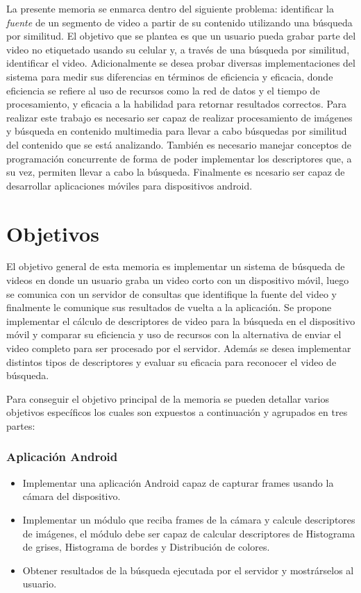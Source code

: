 La presente memoria se enmarca dentro del siguiente problema: identificar la \emph{fuente} de un segmento de video a partir de su contenido utilizando una búsqueda por similitud. El objetivo que se plantea es que un usuario pueda grabar parte del video no etiquetado usando su celular y, a través de una búsqueda por similitud, identificar el video. 
Adicionalmente se desea probar diversas implementaciones del sistema para medir sus diferencias en términos de eficiencia y eficacia, donde eficiencia se refiere al uso de recursos como la red de datos y el tiempo de procesamiento, y eficacia a la habilidad para retornar resultados correctos. Para realizar este trabajo es necesario ser capaz de realizar procesamiento de imágenes y búsqueda en contenido multimedia para llevar a cabo búsquedas por similitud del contenido que se está analizando. También es necesario manejar conceptos de programación concurrente de forma de poder implementar los descriptores que, a su vez, permiten llevar a cabo la búsqueda. Finalmente es ncesario ser capaz de desarrollar aplicaciones móviles para dispositivos android.

\section{Objetivos} \label{objetivos}

El objetivo general de esta memoria es implementar un sistema de búsqueda de videos en donde un usuario graba un video corto con un dispositivo móvil, luego se comunica con un servidor de consultas que identifique la fuente del video y finalmente le comunique sus resultados de vuelta a la aplicación. Se propone implementar el cálculo de descriptores de video para la búsqueda en el dispositivo móvil y comparar su eficiencia y uso de recursos con la alternativa de enviar el video completo para ser procesado por el servidor. Además se desea implementar distintos tipos de descriptores y evaluar su eficacia para reconocer el video de búsqueda.

Para conseguir el objetivo principal de la memoria se pueden detallar varios objetivos específicos los cuales son expuestos a continuación y agrupados en tres partes: 
\subsubsection*{Aplicación Android}
\begin{itemize}
\item Implementar una aplicación Android capaz de capturar frames usando la cámara del dispositivo.
\item Implementar un módulo que reciba frames de la cámara y calcule descriptores de imágenes, el módulo debe ser capaz de calcular descriptores de Histograma de grises, Histograma de bordes y Distribución de colores.
\item Obtener resultados de la búsqueda ejecutada por el servidor y mostrárselos al usuario.
\end{itemize}
